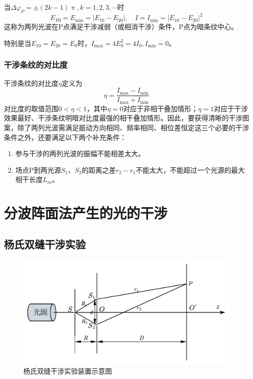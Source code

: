 \documentclass[12pt]{article}
\begin{document}
当\(\Delta \varphi_P = \pm (2k-1) \uppi, k=1,2,3,\cdots\)时
\begin{equation}
E_{P 0}=E_{\min }=\left|E_{10}-E_{20}\right|, \quad I=I_{\min }=\left|E_{10}-E_{20}\right|^2
\end{equation}
这称为两列光波在P点满足干涉减弱（或相消干涉）条件，P点为暗条纹中心。

特别是当\(E_{10} = E_{20} = E_{0}\)时，\(I_{\mathrm{max}} = 4 E_0^2 = 4 I_0, I_{\mathrm{min}} = 0\)。

\subsubsection{干涉条纹的对比度}

干涉条纹的对比度\(\eta\)定义为
\begin{equation}
    \eta = \frac{I_{\mathrm{max}} - I_{\mathrm{min}}}{I_{\mathrm{max}} + I_{\mathrm{min}}}
\end{equation}
对比度的取值范围\(0<\eta<1\)，其中\(\eta=0\)对应于非相干叠加情形；\(\eta=1\)对应于干涉效果最好、干涉条纹明暗对比度最强的相干叠加情形。因此，要获得清晰的干涉图案，除了两列光波需满足振动方向相同、频率相同、相位差恒定这三个必要的干涉 条件之外，还要满足以下两个补充条件：
\begin{enumerate}
    \item 参与干涉的两列光波的振幅不能相差太大。
    \item 场点P到两光源\(S_1\)、\(S_2\)的距离之差\(r_2 - r_1\)不能太大，不能超过一个光源的最大相干长度\(L_m\)。
\end{enumerate}

\section{分波阵面法产生的光的干涉}

\subsection{杨氏双缝干涉实验}

\begin{figure}[!h]
    \centering
    \includegraphics[width=.6\textwidth]{graphics/双缝干涉实验.png}
    \caption{杨氏双缝干涉实验装置示意图}
\end{figure}
\end{document}
